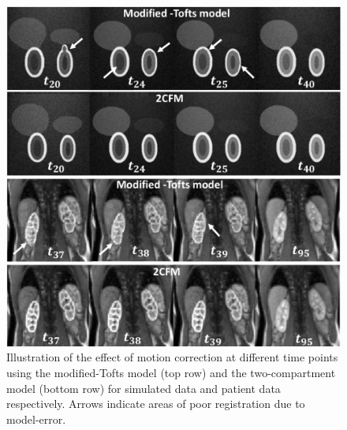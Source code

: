 \documentclass[num-refs]{wiley-article}
\begin{document}
\begin{figure}[tb!]
	\begin{center}
		\includegraphics[width=\textwidth]{Figures/9.eps}
		\caption{  Illustration of the effect of motion correction at different time points using the modified-Tofts model (top row) and the two-compartment model (bottom row) for simulated data and patient data respectively. Arrows indicate areas of poor registration due to model-error.}
	\end{center}
\end{figure}
\end{document}
